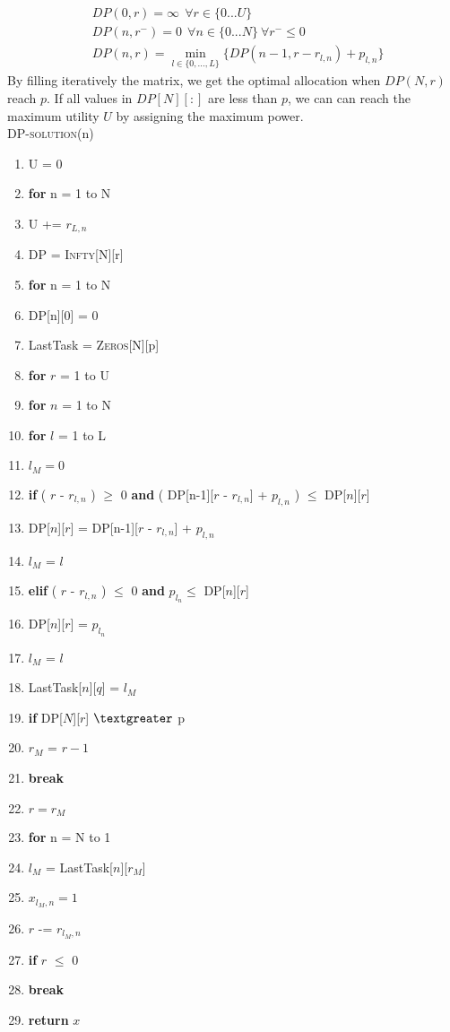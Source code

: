 \documentclass[11pt, oneside]{report}
\begin{document}
\begin{align*}
&DP(0,r) = \infty \ \  \forall r\in \{0...U\} \\
&DP(n,r^{-}) = 0\ \ \forall n\in \{0...N\}\ \forall r^{-} \le 0 \\
&DP(n,r) =  \min_{l \in \{0,...,L\}} \{ DP(n-1, r-r_{l,n}) + p_{l,n} \}
\end{align*}
By filling iteratively the matrix, we get the optimal allocation when $DP(N,r)$ reach $p$. If all values in $DP[N][:]$ are less than $p$, we can can reach the maximum utility $U$ by assigning the maximum power.\\

\noindent\textsc{DP-solution}(n)
\begin{enumerate}[1\ ]
\setlength{\topsep}{0.05ex}
\setlength{\itemsep}{0.05ex}
\item U = 0
\item \textbf{for} n = 1 to N
\item \qquad U += $r_{L,n}$
\item DP = \textsc{Infty}[N][r]
\item \textbf{for} n = 1 to N
\item \qquad DP[n][0] = 0
\item LastTask = \textsc{Zeros}[N][p]
\item \textbf{for} $r$ = 1 to U
\item \qquad \textbf{for} $n$ = 1 to N
\item \qquad \qquad \textbf{for} $l$ = 1 to L
\item \qquad \qquad \qquad $l_M = 0$
\item \qquad \qquad \qquad \textbf{if} ( $r$ - $r_{l,n}$ ) $\geq$ 0 \textbf{and}  ( DP[n-1][$r$ - $r_{l,n}$] + $p_{l,n}$ ) $\leq$ DP[$n$][$r$]
\item \qquad \qquad \qquad \qquad DP[$n$][$r$] = DP[n-1][$r$ - $r_{l,n}$] + $p_{l,n}$
\item \qquad \qquad \qquad \qquad $l_M$ = $l$
\item \qquad \qquad \qquad \textbf{elif} ( $r$ - $r_{l,n}$ ) $\leq$ 0 \textbf{and} $p_{l_n} \leq$ DP[$n$][$r$]
\item \qquad \qquad \qquad \qquad DP[$n$][$r$] = $p_{l_n}$
\item \qquad \qquad \qquad \qquad $l_M$ = $l$
\item \qquad \qquad LastTask[$n$][$q$] = $l_M$
\item \qquad \textbf{if} DP[$N$][$r$] $\textgreater$ p
\item \qquad \qquad $r_M$ = $r-1$
\item \qquad \qquad \textbf{break}
\item $r = r_M$
\item \textbf{for} n = N to 1
\item \qquad $l_M$ = LastTask[$n$][$r_M$]
\item \qquad $x_{l_M, n} = 1$
\item \qquad $r$ -= $r_{l_M, n}$
\item \qquad \textbf{if} $r$ $\leq$ 0
\item \qquad \qquad \textbf{break}
\item \textbf{return} $x$
\end{enumerate}
\end{document}

